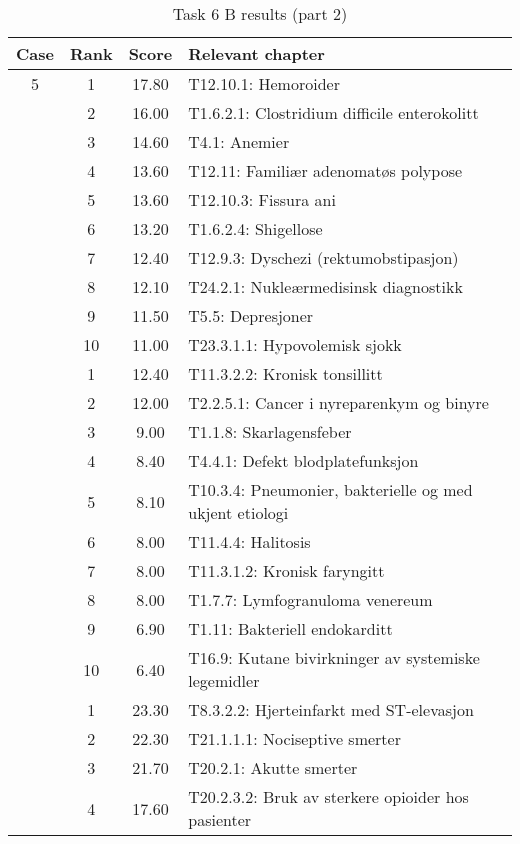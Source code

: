 \begin{table}[htbp] \footnotesize \center
\caption{Task 6 B results (part 2)\label{tab:task6b2}}
\begin{tabular}{c c c l}
    \toprule
    Case & Rank & Score & Relevant chapter \\
    \midrule
    5 & 1 & 17.80 & T12.10.1: Hemoroider \\
     & 2 & 16.00 & T1.6.2.1: Clostridium difficile enterokolitt \\
     & 3 & 14.60 & T4.1: Anemier \\
     & 4 & 13.60 & T12.11: Familiær adenomatøs polypose \\
     & 5 & 13.60 & T12.10.3: Fissura ani \\
     & 6 & 13.20 & T1.6.2.4: Shigellose \\
     & 7 & 12.40 & T12.9.3: Dyschezi (rektumobstipasjon) \\
     & 8 & 12.10 & T24.2.1: Nukleærmedisinsk diagnostikk \\
     & 9 & 11.50 & T5.5: Depresjoner \\
     & 10 & 11.00 & T23.3.1.1: Hypovolemisk sjokk \\
	\addlinespace
    6 & 1 & 12.40 & T11.3.2.2: Kronisk tonsillitt \\
     & 2 & 12.00 & T2.2.5.1: Cancer i nyreparenkym og binyre \\
     & 3 & 9.00 & T1.1.8: Skarlagensfeber \\
     & 4 & 8.40 & T4.4.1: Defekt blodplatefunksjon \\
     & 5 & 8.10 & T10.3.4: Pneumonier, bakterielle og med ukjent etiologi \\
     & 6 & 8.00 & T11.4.4: Halitosis \\
     & 7 & 8.00 & T11.3.1.2: Kronisk faryngitt \\
     & 8 & 8.00 & T1.7.7: Lymfogranuloma venereum \\
     & 9 & 6.90 & T1.11: Bakteriell endokarditt \\
     & 10 & 6.40 & T16.9: Kutane bivirkninger av systemiske legemidler \\
	\addlinespace
    7 & 1 & 23.30 & T8.3.2.2: Hjerteinfarkt med ST-elevasjon \\
     & 2 & 22.30 & T21.1.1.1: Nociseptive smerter \\
     & 3 & 21.70 & T20.2.1: Akutte smerter \\
     & 4 & 17.60 & T20.2.3.2: Bruk av sterkere opioider hos pasienter \\%

\end{tabular}
\end{table}
